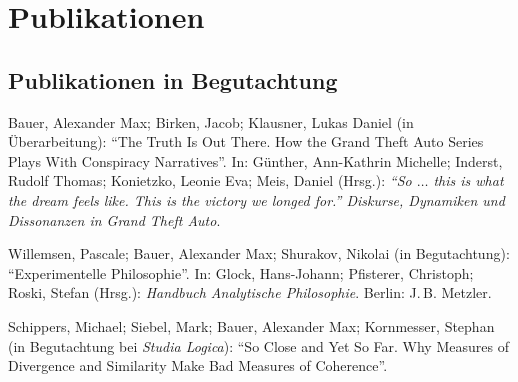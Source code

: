 \documentclass[a4paper,10pt]{article}
\newenvironment{literature}{%
   \parskip6pt\parindent0pt\raggedright
   \def\lititem{\hangindent=1cm\hangafter1}}{%
   \par\ignorespaces}
\begin{document}
\clearpage
\section{Publikationen}


\subsection*{Publikationen in Begutachtung}
\begin{literature}
\lititem Bauer, Alexander Max; Birken, Jacob; Klausner,  Lukas Daniel (in Überarbeitung): \enquote{The Truth Is Out There. How the Grand Theft Auto Series Plays With Conspiracy Narratives}. In: Günther, Ann-Kathrin Michelle; Inderst, Rudolf Thomas; Konietzko, Leonie Eva;  Meis, Daniel (Hrsg.): \textit{\enquote{So $\ldots$ this is what the dream feels like. This is the victory we longed for.} Diskurse, Dynamiken und Dissonanzen in Grand Theft Auto}.

\lititem Willemsen, Pascale; Bauer, Alexander Max; Shurakov, Nikolai (in Begutachtung): \enquote{Experimentelle Philosophie}. In: Glock, Hans-Johann; Pfisterer, Christoph; Roski, Stefan (Hrsg.): \textit{Handbuch Analytische Philosophie}. Berlin: J.\,B. Metzler.

\lititem Schippers, Michael; Siebel, Mark; Bauer, Alexander Max; Kornmesser, Stephan (in Begutachtung bei \textit{Studia Logica}): \enquote{So Close and Yet So Far. Why Measures of Divergence and Similarity Make Bad Measures of Coherence}.
\end{literature}


\end{document}
